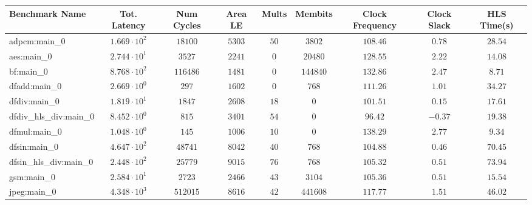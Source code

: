 \begin{tabular}{|l|c|c|c|c|c|c|c|c|}
\hline
Benchmark Name          & Tot. Latency           & Num Cycles & Area LE   & Mults   & Membits    & Clock Frequency & Clock Slack & HLS Time(s) \\
\hline
adpcm:main\_0           & $ 1.669 \cdot 10^{2} $ & $ 18100  $ & $ 5303  $ & $ 50  $ & $ 3802   $ & $ 108.46      $ & $ 0.78    $ & $ 28.54   $ \\
aes:main\_0             & $ 2.744 \cdot 10^{1} $ & $ 3527   $ & $ 2241  $ & $ 0   $ & $ 20480  $ & $ 128.55      $ & $ 2.22    $ & $ 14.08   $ \\
bf:main\_0              & $ 8.768 \cdot 10^{2} $ & $ 116486 $ & $ 1481  $ & $ 0   $ & $ 144840 $ & $ 132.86      $ & $ 2.47    $ & $ 8.71    $ \\
dfadd:main\_0           & $ 2.669 \cdot 10^{0} $ & $ 297    $ & $ 1602  $ & $ 0   $ & $ 768    $ & $ 111.26      $ & $ 1.01    $ & $ 34.27   $ \\
dfdiv:main\_0           & $ 1.819 \cdot 10^{1} $ & $ 1847   $ & $ 2608  $ & $ 18  $ & $ 0      $ & $ 101.51      $ & $ 0.15    $ & $ 17.61   $ \\
dfdiv\_hls\_div:main\_0 & $ 8.452 \cdot 10^{0} $ & $ 815    $ & $ 3401  $ & $ 54  $ & $ 0      $ & $ 96.42       $ & $ -0.37   $ & $ 19.38   $ \\
dfmul:main\_0           & $ 1.048 \cdot 10^{0} $ & $ 145    $ & $ 1006  $ & $ 10  $ & $ 0      $ & $ 138.29      $ & $ 2.77    $ & $ 9.34    $ \\
dfsin:main\_0           & $ 4.647 \cdot 10^{2} $ & $ 48741  $ & $ 8042  $ & $ 40  $ & $ 768    $ & $ 104.88      $ & $ 0.46    $ & $ 70.45   $ \\
dfsin\_hls\_div:main\_0 & $ 2.448 \cdot 10^{2} $ & $ 25779  $ & $ 9015  $ & $ 76  $ & $ 768    $ & $ 105.32      $ & $ 0.51    $ & $ 73.94   $ \\
gsm:main\_0             & $ 2.584 \cdot 10^{1} $ & $ 2723   $ & $ 2466  $ & $ 43  $ & $ 3104   $ & $ 105.36      $ & $ 0.51    $ & $ 15.54   $ \\
jpeg:main\_0            & $ 4.348 \cdot 10^{3} $ & $ 512015 $ & $ 8616  $ & $ 42  $ & $ 441608 $ & $ 117.77      $ & $ 1.51    $ & $ 46.02   $ \\

\end{tabular}
